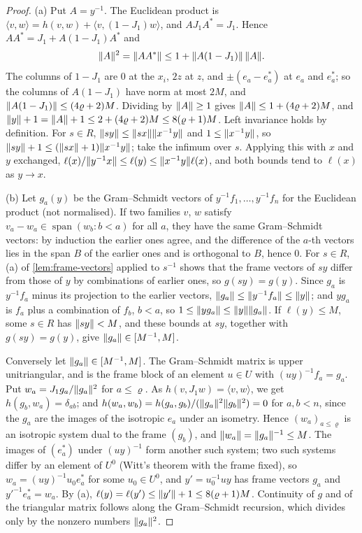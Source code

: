 \begin{proof}
(a) Put $A=y^{-1}$. The Euclidean product is $\langle v,w\rangle=h(v,w)+\langle v,(1-J_1)w\rangle$, and $AJ_1A^*=J_1$. Hence $AA^*=J_1+A(1-J_1)A^*$ and
\[
  \lVert A\rVert^2=\lVert AA^*\rVert\le1+\lVert A(1-J_1)\rVert\,\lVert A\rVert .
\]
The columns of $1-J_1$ are $0$ at the $x_i$, $2z$ at $z$, and $\pm(e_a-e^*_a)$ at $e_a$ and $e^*_a$; so the columns of $A(1-J_1)$ have norm at most $2M$, and $\lVert A(1-J_1)\rVert\le(4\varrho+2)M$.
Dividing by $\lVert A\rVert\ge1$ gives $\lVert A\rVert\le1+(4\varrho+2)M$, and $\lVert y\rVert+1=\lVert A\rVert+1\le2+(4\varrho+2)M\le8(\varrho+1)M$. Left invariance holds by definition. For $s\in R$,
$\lVert sy\rVert\le\lVert sx\rVert\lVert x^{-1}y\rVert$ and $1\le\lVert x^{-1}y\rVert$, so $\lVert sy\rVert+1\le(\lVert sx\rVert+1)\lVert x^{-1}y\rVert$; take the infimum over $s$. Applying this with $x$ and $y$ exchanged,
$\ell(x)/\lVert y^{-1}x\rVert\le\ell(y)\le\lVert x^{-1}y\rVert\ell(x)$, and both bounds tend to $\ell(x)$ as $y\to x$.

(b) Let $g_a(y)$ be the Gram--Schmidt vectors of $y^{-1}f_1,\dots,y^{-1}f_n$ for the Euclidean product (not normalised). If two families $v$, $w$ satisfy $v_a-w_a\in\operatorname{span}(w_b:b<a)$ for all
$a$, they have the same Gram--Schmidt vectors: by induction the earlier ones agree, and the difference of the $a$-th vectors lies in the span $B$ of the earlier ones and is orthogonal to $B$, hence $0$.
For $s\in R$, (a) of \cref{lem:frame-vectors} applied to $s^{-1}$ shows that the frame vectors of $sy$ differ from those of $y$ by combinations of earlier ones, so $g(sy)=g(y)$.
Since $g_a$ is $y^{-1}f_a$ minus its projection to the earlier vectors, $\lVert g_a\rVert\le\lVert y^{-1}f_a\rVert\le\lVert y\rVert$; and $yg_a$ is $f_a$ plus a combination of $f_b$, $b<a$, so $1\le\lVert yg_a\rVert\le\lVert y\rVert\lVert g_a\rVert$.
If $\ell(y)\le M$, some $s\in R$ has $\lVert sy\rVert<M$, and these bounds at $sy$, together with $g(sy)=g(y)$, give $\lVert g_a\rVert\in[M^{-1},M]$.

Conversely let $\lVert g_a\rVert\in[M^{-1},M]$. The Gram--Schmidt matrix is upper unitriangular, and is the frame block of an element $u\in U$ with $(uy)^{-1}f_a=g_a$. Put $w_a=J_1g_a/\lVert g_a\rVert^2$ for $a\le\varrho$.
As $h(v,J_1w)=\langle v,w\rangle$, we get $h(g_b,w_a)=\delta_{ab}$; and $h(w_a,w_b)=h(g_a,g_b)/(\lVert g_a\rVert^2\lVert g_b\rVert^2)=0$ for $a,b<n$, since the $g_a$ are the images of the isotropic $e_a$ under an isometry. Hence $(w_a)_{a\le\varrho}$ is an isotropic system dual to the
frame $(g_b)$, and $\lVert w_a\rVert=\lVert g_a\rVert^{-1}\le M$. The images of $(e^*_a)$ under $(uy)^{-1}$ form another such system; two such systems differ by an element of $U^0$ (Witt's theorem with the frame fixed), so
$w_a=(uy)^{-1}u_0e^*_a$ for some $u_0\in U^0$, and $y'=u_0^{-1}uy$ has frame vectors $g_a$ and $y'^{-1}e^*_a=w_a$. By (a), $\ell(y)=\ell(y')\le\lVert y'\rVert+1\le8(\varrho+1)M$. Continuity of $g$ and of the
triangular matrix follows along the Gram--Schmidt recursion, which divides only by the nonzero numbers $\lVert g_a\rVert^2$.


\end{proof}
